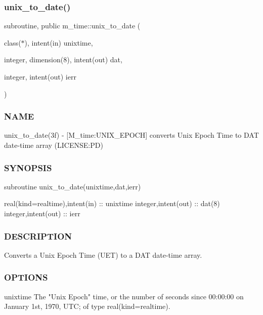 \subsubsection{\texorpdfstring{unix\+\_\+to\+\_\+date()}{unix\_to\_date()}}
{\footnotesize\ttfamily subroutine, public m\+\_\+time\+::unix\+\_\+to\+\_\+date (\begin{DoxyParamCaption}\item[{class($\ast$), intent(in)}]{unixtime,  }\item[{integer, dimension(8), intent(out)}]{dat,  }\item[{integer, intent(out)}]{ierr }\end{DoxyParamCaption})}



\subsubsection*{N\+A\+ME}

unix\+\_\+to\+\_\+date(3f) -\/ \mbox{[}M\+\_\+time\+:U\+N\+I\+X\+\_\+\+E\+P\+O\+CH\mbox{]} converts Unix Epoch Time to D\+AT date-\/time array (L\+I\+C\+E\+N\+SE\+:PD) 

\subsubsection*{S\+Y\+N\+O\+P\+S\+IS}

\begin{DoxyVerb}subroutine unix_to_date(unixtime,dat,ierr)

 real(kind=realtime),intent(in) :: unixtime
 integer,intent(out)            :: dat(8)
 integer,intent(out)            :: ierr
\end{DoxyVerb}


\subsubsection*{D\+E\+S\+C\+R\+I\+P\+T\+I\+ON}

Converts a Unix Epoch Time (U\+ET) to a D\+AT date-\/time array.

\subsubsection*{O\+P\+T\+I\+O\+NS}

\begin{DoxyVerb}unixtime  The "Unix Epoch" time, or the number of seconds since
          00:00:00 on January 1st, 1970, UTC; of type
          real(kind=realtime).
\end{DoxyVerb}


